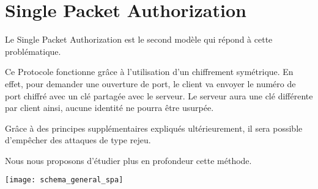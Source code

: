 \chapter{Single Packet Authorization}

Le Single Packet Authorization est le second modèle qui répond à cette problématique.

Ce Protocole fonctionne grâce à l'utilisation d'un chiffrement symétrique. En effet, pour demander une ouverture de port, le client va envoyer le numéro de port chiffré avec un clé partagée avec le serveur. Le serveur aura une clé différente par client ainsi, aucune identité ne pourra être usurpée.

Grâce à des principes supplémentaires expliqués ultérieurement, il sera possible d'empêcher des attaques de type rejeu.

Nous nous proposons d'étudier plus en profondeur cette méthode.

\texttt{[image: schema\_general\_spa]}
